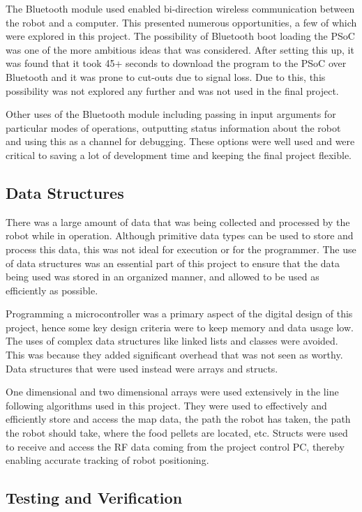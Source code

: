 \documentclass{article}
\begin{document}
The Bluetooth module used enabled bi-direction wireless communication between the robot and a computer. This presented numerous opportunities, a few of which were explored in this project. The possibility of Bluetooth boot loading the PSoC was one of the more ambitious ideas that was considered. After setting this up, it was found that it took 45+ seconds to download the program to the PSoC over Bluetooth and it was prone to cut-outs due to signal loss. Due to this, this possibility was not explored any further and was not used in the final project.

Other uses of the Bluetooth module including passing in input arguments for particular modes of operations, outputting status information about the robot and using this as a channel for debugging. These options were well used and were critical to saving a lot of development time and keeping the final project flexible.

\subsection{Data Structures}

There was a large amount of data that was being collected and processed by the robot while in operation. Although primitive data types can be used to store and process this data, this was not ideal for execution or for the programmer. The use of data structures was an essential part of this project to ensure that the data being used was stored in an organized manner, and allowed to be used as efficiently as possible. 

Programming a microcontroller was a primary aspect of the digital design of this project, hence some key design criteria were to keep memory and data usage low. The uses of complex data structures like linked lists and classes were avoided. This was because they added significant overhead that was not seen as worthy. Data structures that were used instead were arrays and structs.

One dimensional and two dimensional arrays were used extensively in the line following algorithms used in this project. They were used to effectively and efficiently store and access the map data, the path the robot has taken, the path the robot should take, where the food pellets are located, etc. Structs were used to receive and access the RF data coming from the project control PC, thereby enabling accurate tracking of robot positioning.

\subsection{Testing and Verification}
\end{document}
